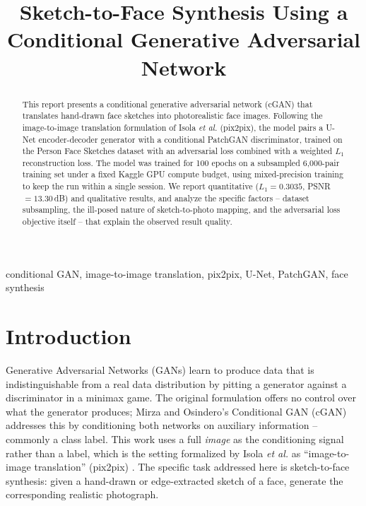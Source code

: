 \documentclass[conference]{IEEEtran}
\begin{document}
\title{Sketch-to-Face Synthesis Using a Conditional Generative Adversarial Network}

\author{
}

\maketitle

\begin{abstract}
This report presents a conditional generative adversarial network (cGAN) that translates
hand-drawn face sketches into photorealistic face images. Following the image-to-image
translation formulation of Isola \textit{et al.} (pix2pix), the model pairs a U-Net
encoder-decoder generator with a conditional PatchGAN discriminator, trained on the
Person Face Sketches dataset with an adversarial loss combined with a weighted
$L_1$ reconstruction loss. The model was trained for 100 epochs on a subsampled
6{,}000-pair training set under a fixed Kaggle GPU compute budget, using mixed-precision
training to keep the run within a single session. We report quantitative
($L_1 = 0.3035$, PSNR $= 13.30$\,dB) and qualitative results, and analyze the specific
factors -- dataset subsampling, the ill-posed nature of sketch-to-photo mapping, and the
adversarial loss objective itself -- that explain the observed result quality.
\end{abstract}

\begin{IEEEkeywords}
conditional GAN, image-to-image translation, pix2pix, U-Net, PatchGAN, face synthesis
\end{IEEEkeywords}

\section{Introduction}

Generative Adversarial Networks (GANs) \cite{goodfellow2014gan} learn to produce data
that is indistinguishable from a real data distribution by pitting a generator against a
discriminator in a minimax game. The original formulation offers no control over what the
generator produces; Mirza and Osindero's Conditional GAN (cGAN) \cite{mirza2014cgan}
addresses this by conditioning both networks on auxiliary information -- commonly a class
label. This work uses a full \emph{image} as the conditioning signal rather than a label,
which is the setting formalized by Isola \textit{et al.} as ``image-to-image translation''
(pix2pix) \cite{isola2017pix2pix}. The specific task addressed here is sketch-to-face
synthesis: given a hand-drawn or edge-extracted sketch of a face, generate the
corresponding realistic photograph.
\end{document}
